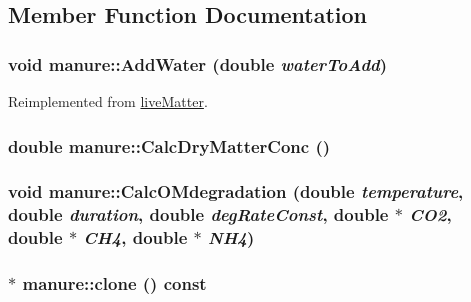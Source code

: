 \subsection{Member Function Documentation}
\hypertarget{classmanure_aad5e7bf3c405be74990b85a5d4fd4b49}{
\subsubsection[{AddWater}]{\setlength{\rightskip}{0pt plus 5cm}void manure::AddWater (double {\em waterToAdd})}}
\label{classmanure_aad5e7bf3c405be74990b85a5d4fd4b49}


Reimplemented from \hyperlink{classlive_matter_af84f48b8ee8f67cea63b35d033cefe3b}{liveMatter}.\hypertarget{classmanure_a8c330c3c3c05dc44b7c75eae581b717c}{
\subsubsection[{CalcDryMatterConc}]{\setlength{\rightskip}{0pt plus 5cm}double manure::CalcDryMatterConc ()}}
\label{classmanure_a8c330c3c3c05dc44b7c75eae581b717c}
\hypertarget{classmanure_a8262006c9db5b1e7fcdb0b73e8f23260}{
\subsubsection[{CalcOMdegradation}]{\setlength{\rightskip}{0pt plus 5cm}void manure::CalcOMdegradation (double {\em temperature}, \/  double {\em duration}, \/  double {\em degRateConst}, \/  double $\ast$ {\em CO2}, \/  double $\ast$ {\em CH4}, \/  double $\ast$ {\em NH4})}}
\label{classmanure_a8262006c9db5b1e7fcdb0b73e8f23260}
\hypertarget{classmanure_af2915d37963e5f4d3a4b0c0d91fab188}{
\subsubsection[{clone}]{ $\ast$ manure::clone () const}}
\label{classmanure_af2915d37963e5f4d3a4b0c0d91fab188}


